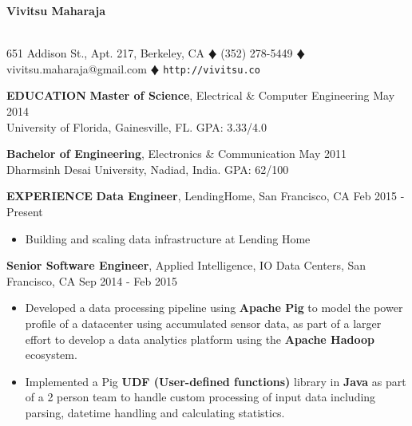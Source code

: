 \documentclass[10pt, letterpaper]{article}
\begin{document}
\begin{center}
\textbf{\Large Vivitsu Maharaja}
\date{}
\thispagestyle{empty}
\smallskip \\
651 Addison St., Apt. 217, Berkeley, CA $\vardiamond$ (352) 278-5449 $\vardiamond$ vivitsu.maharaja@gmail.com $\vardiamond$ \texttt{http://vivitsu.co}
\end{center}

\textbf{EDUCATION}
\smallskip
\newline
{\bf Master of Science}, Electrical \& Computer Engineering \hfill May 2014\\
University of Florida, Gainesville, FL. \hfill GPA: 3.33/4.0

{\bf Bachelor of Engineering}, Electronics \& Communication \hfill May 2011\\
Dharmsinh Desai University, Nadiad, India. \hfill GPA: 62/100

\textbf{EXPERIENCE}
\smallskip
\newline
\textbf{Data Engineer}, LendingHome, San Francisco, CA \hfill Feb 2015 - Present
\begin{itemize}
    \item Building and scaling data infrastructure at Lending Home
\end{itemize}  
\textbf{Senior Software Engineer}, Applied Intelligence, IO Data Centers, San Francisco, CA \hfill Sep 2014 - Feb 2015
\begin{itemize}
    \item Developed a data processing pipeline using \textbf{Apache Pig} to model 
the power profile of a datacenter using accumulated sensor data, as part of a larger effort to develop a data analytics
platform using the \textbf{Apache Hadoop} ecosystem.
    \item Implemented a Pig \textbf{UDF (User-defined functions)} library in \textbf{Java} as part of a 2 person team
to handle custom processing of input data including parsing, datetime handling and
calculating statistics.
\end{itemize}
\end{document}

